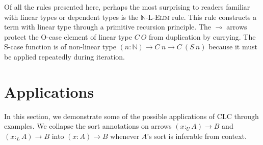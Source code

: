 \documentclass[sigplan,screen]{acmart}
\theoremstyle{definition}
\newcommand{\rname}[1]{\textsc{\footnotesize #1}}
\newcommand{\utype}{:_{\scriptscriptstyle U}}
\newcommand{\ltype}{:_{\scriptscriptstyle L}}
\begin{document}
  Of all the rules presented here, perhaps the most surprising to readers familiar with linear types or dependent types is the \rname{$\mathbb{N}$-L-Elim} rule. This rule constructs a term with linear type through a primitive recursion principle. The $\multimap$ arrows protect the O-case element of linear type $C\ O$ from duplication by currying. The S-case function is of non-linear type $(n : \mathbb{N}) \rightarrow C\ n \rightarrow C\ (S\ n)$ because it must be applied repeatedly during iteration.
  
  \section{Applications}
  In this section, we demonstrate some of the possible applications of CLC through examples. We collapse the sort annotations on arrows $(x \utype A) \rightarrow B$ and $(x \ltype A) \rightarrow B$ into $(x : A) \rightarrow B$ whenever $A$'s sort is inferable from context.
\end{document}
